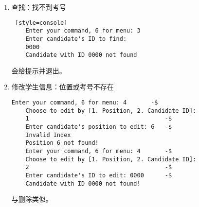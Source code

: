 \begin{enumerate}
\begin{lstlisting} [style=console]
    Enter your command, 6 for menu: // ...
\end{lstlisting}
    会给提示并退出。

    \item 查找：找不到考号
\begin{lstlisting} [style=console]
    Enter your command, 6 for menu: 3
    Enter candidate's ID to find: 
    0000
    Candidate with ID 0000 not found
\end{lstlisting}
    会给提示并退出。

    \item 修改学生信息：位置或考号不存在
\begin{lstlisting}[style=console]
    Enter your command, 6 for menu: 4       -$
    Choose to edit by [1. Position, 2. Candidate ID]: 
    1                                       -$
    Enter candidate's position to edit: 6   -$
    Invalid Index
    Position 6 not found!
    Enter your command, 6 for menu: 4       -$
    Choose to edit by [1. Position, 2. Candidate ID]: 
    2                                       -$
    Enter candidate's ID to edit: 0000      -$
    Candidate with ID 0000 not found!
\end{lstlisting}
    与删除类似。

\end{enumerate}
